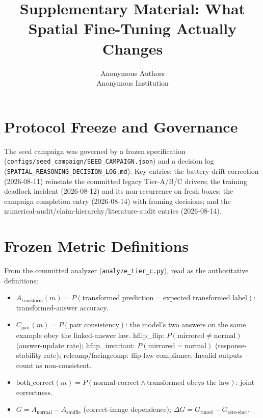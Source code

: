 \documentclass[10pt,twocolumn,letterpaper]{article}
\title{Supplementary Material: What Spatial Fine-Tuning Actually Changes}
\author{Anonymous Authors\\
Anonymous Institution}
\begin{document}
\maketitle

\section{Protocol Freeze and Governance}
The seed campaign was governed by a frozen specification
(\texttt{configs/seed\_campaign/\allowbreak{}SEED\_CAMPAIGN.json}) and a
decision log
(\texttt{SPATIAL\_REASONING\_\allowbreak{}DECISION\_LOG.md}). Key entries:
the battery drift correction (2026-08-11) reinstate the committed legacy
Tier-A/B/C drivers; the training deadlock incident (2026-08-12) and its
non-recurrence on fresh boxes; the campaign completion entry (2026-08-14)
with framing decisions; and the
numerical-audit/claim-hierarchy/literature-audit entries (2026-08-14).

\section{Frozen Metric Definitions}
From the committed analyzer (\texttt{analyze\_tier\_c.py}), read as the
authoritative definitions:
\begin{itemize}[leftmargin=*]
  \item $A_{\text{transform}}(m) = P(\text{transformed prediction} =
        \text{expected transformed label})$: transformed-answer accuracy.
  \item $C_{\text{pair}}(m) = P(\text{pair consistency})$: the model's two
        answers on the same example obey the linked-answer law.
        hflip\_flip: $P(\text{mirrored} \neq \text{normal})$ (answer-update
        rate); hflip\_invariant: $P(\text{mirrored} = \text{normal})$
        (response-stability rate); relcomp/facingcomp: flip-law
        compliance. Invalid outputs count as non-consistent.
  \item $\text{both\_correct}(m) = P(\text{normal-correct} \wedge
        \text{transformed obeys the law})$: joint correctness.
  \item $G = A_{\text{normal}} - A_{\text{shuffle}}$ (correct-image
        dependence); $\Delta G = G_{\text{tuned}} - G_{\text{zero-shot}}$.
\end{itemize}
\end{document}
